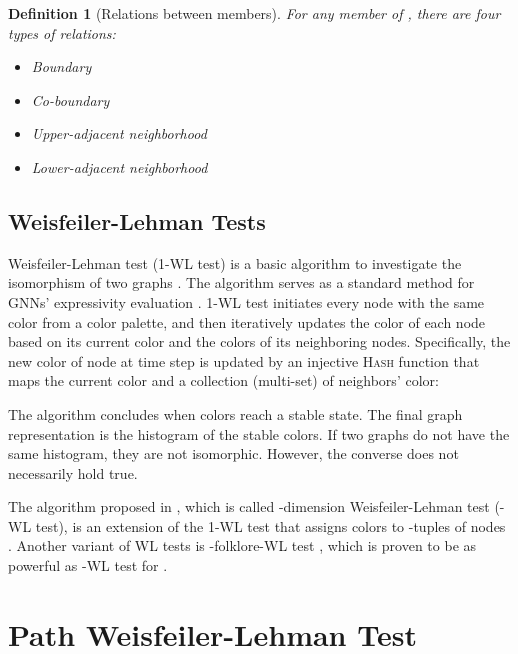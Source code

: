 \documentclass[letterpaper]{article} \usepackage{aaai24}  \usepackage{times}  \usepackage{helvet}  \usepackage{courier}  \usepackage[hyphens]{url}  \usepackage{graphicx} \urlstyle{rm} \def\UrlFont{\rm}  \usepackage{natbib}  \usepackage{caption} \frenchspacing  \setlength{\pdfpagewidth}{8.5in} \setlength{\pdfpageheight}{11in} \usepackage{algorithm}
\newtheorem{definition}{Definition}
\begin{document}
\begin{definition}[Relations between members]{\cite{bodnar_weisfeiler_2021, bodnar_weisfeiler_2022}} \label{def:adj_relations}
    For any member  of , there are four types of relations:
    \begin{itemize}
        \item Boundary  
        \item Co-boundary 
        \item Upper-adjacent neighborhood 
        \item Lower-adjacent neighborhood 
    \end{itemize}
\end{definition}

\subsection{Weisfeiler-Lehman Tests}
Weisfeiler-Lehman test (1-WL test) is a basic algorithm to investigate the isomorphism of two graphs \cite{weisfeiler_reduction_1968}. The algorithm serves as a standard method for GNNs' expressivity evaluation \cite{maron_provably_2019,xu_how_2019, morris_weisfeiler_2019,chen_can_2020,bodnar_weisfeiler_2021, bodnar_weisfeiler_2022}. 1-WL test initiates every node with the same color from a color palette, and then iteratively updates the color of each node based on its current color and the colors of its neighboring nodes. Specifically, the new color  of node  at time step  is updated by an injective \textsc{Hash} function that maps the current color  and a collection (multi-set) of neighbors' color:

The algorithm concludes when colors reach a stable state. The final graph representation is the histogram of the stable colors. If two graphs do not have the same histogram, they are not isomorphic. However, the converse does not necessarily hold true.

The algorithm proposed in \cite{grohe_pebble_2012, grohe_descriptive_2017}, which is called -dimension Weisfeiler-Lehman test (-WL test), is an extension of the 1-WL test that assigns colors to -tuples of nodes \cite{morris_weisfeiler_2019, huang_short_2021}. Another variant of WL tests is -folklore-WL test \cite{cai_optimal_1989}, which is proven to be as powerful as -WL test \cite{grohe_pebble_2012, grohe_descriptive_2017} for .

\section{Path Weisfeiler-Lehman Test} \label{section:pwl}
\end{document}
